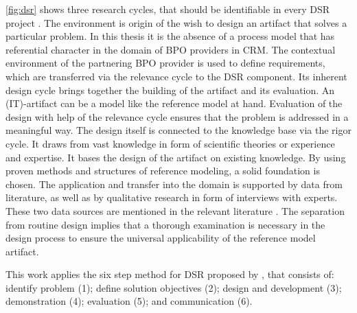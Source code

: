 \Fig \ref{fig:dsr} shows three research cycles, that should be identifiable in every \acrshort{DSR} project \citep{Hevner2010}. The environment is origin of the wish to design an artifact that solves a particular problem. In this thesis it is the absence of a process model that has referential character in the domain of \acrshort{BPO} providers in \acrshort{CRM}. The contextual environment of the partnering  \acrshort{BPO} provider is used to define requirements, which are transferred via the relevance cycle to the \acrshort{DSR} component. Its inherent design cycle brings together the building of the artifact and its evaluation. An (IT)-artifact can be a model \citep{Hevner2010} like the reference model at hand. Evaluation of the design with help of the relevance cycle ensures that the problem is addressed in a meaningful way. The design itself is connected to the knowledge base via the rigor cycle. It draws from vast knowledge in form of scientific theories or experience and expertise. It bases the design of the artifact on existing knowledge. By using proven methods and structures of reference modeling, a solid foundation is chosen. The application and transfer into the domain is supported by data from literature, as well as by qualitative research in form of interviews with experts. These two data sources are mentioned in the relevant literature \citep[]{thomas2006mang}. The separation from routine design implies that a thorough examination is necessary in the design process to ensure the universal applicability of the reference model artifact. 

This work applies the six step method for \acrshort{DSR} proposed by \citep{Hevner2004,Peffers2007}, that consists of: identify problem (1); define solution objectives (2); design and development (3); demonstration (4); evaluation (5); and communication (6). 






